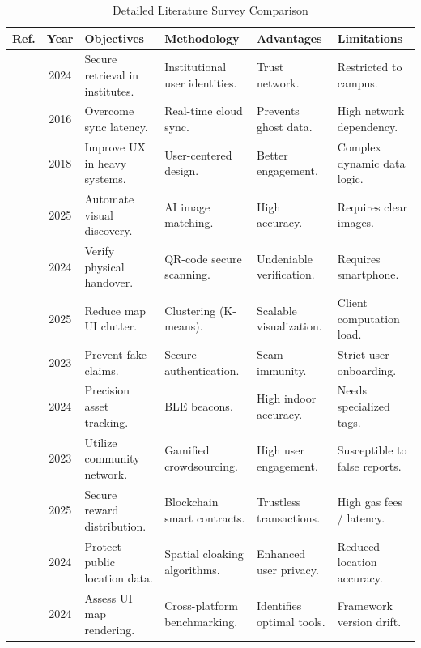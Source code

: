 \documentclass[12pt,a4paper]{report}
\begin{document}
\begin{table}[htbp]
\centering
\caption{Detailed Literature Survey Comparison}
\small %
\setlength{\tabcolsep}{4pt}
\renewcommand{\arraystretch}{1.3} %
\begin{tabularx}{\textwidth}{|c|c|X|X|X|X|}
\hline
\textbf{Ref.} & \textbf{Year} & \textbf{Objectives} & \textbf{Methodology} & \textbf{Advantages} & \textbf{Limitations} \\
\hline
[1] & 2024 & Secure retrieval in institutes. & Institutional user identities. & Trust network. & Restricted to campus. \\
\hline
[2] & 2016 & Overcome sync latency. & Real-time cloud sync. & Prevents ghost data. & High network dependency. \\
\hline
[3] & 2018 & Improve UX in heavy systems. & User-centered design. & Better engagement. & Complex dynamic data logic. \\
\hline
[4] & 2025 & Automate visual discovery. & AI image matching. & High accuracy. & Requires clear images. \\
\hline
[5] & 2024 & Verify physical handover. & QR-code secure scanning. & Undeniable verification. & Requires smartphone. \\
\hline
[6] & 2025 & Reduce map UI clutter. & Clustering (K-means). & Scalable visualization. & Client computation load. \\
\hline
[7] & 2023 & Prevent fake claims. & Secure authentication. & Scam immunity. & Strict user onboarding. \\
\hline
[8] & 2024 & Precision asset tracking. & BLE beacons. & High indoor accuracy. & Needs specialized tags. \\
\hline
[9] & 2023 & Utilize community network. & Gamified crowdsourcing. & High user engagement. & Susceptible to false reports. \\
\hline
[10] & 2025 & Secure reward distribution. & Blockchain smart contracts. & Trustless transactions. & High gas fees / latency. \\
\hline
[11] & 2024 & Protect public location data. & Spatial cloaking algorithms. & Enhanced user privacy. & Reduced location accuracy. \\
\hline
[12] & 2024 & Assess UI map rendering. & Cross-platform benchmarking. & Identifies optimal tools. & Framework version drift. \\
\hline
\end{tabularx}
\end{table}
\end{document}
